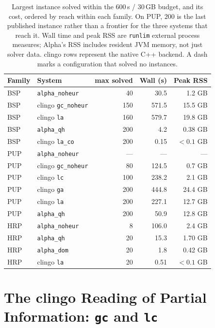 \begin{table}[H]
\centering
\small
\begin{tabular}{llrrr}
\toprule
\textbf{Family} & \textbf{System} & \textbf{max solved} & \textbf{Wall (s)} & \textbf{Peak RSS}\\
\midrule
BSP & \texttt{alpha\_noheur}            & 40  & 30.5  & 1.2 GB\\
BSP & clingo \texttt{gc\_noheur}        & 150 & 571.5 & 15.5 GB\\
BSP & clingo \texttt{la}               & 160 & 579.7 & 19.8 GB\\
BSP & \texttt{alpha\_qh}               & 200 & 4.2   & 0.38 GB\\
BSP & clingo \texttt{la\_co}            & 200 & 0.15  & $<0.1$ GB\\
\midrule
PUP & \texttt{alpha\_noheur}            & --- & ---   & ---\\
PUP & clingo \texttt{gc\_noheur}        & 80  & 124.5 & 0.7 GB\\
PUP & clingo \texttt{lc}               & 100 & 238.2 & 2.1 GB\\
PUP & clingo \texttt{ga}               & 200 & 444.8 & 24.4 GB\\
PUP & clingo \texttt{la}               & 200 & 227.1 & 12.7 GB\\
PUP & \texttt{alpha\_qh}               & 200 & 50.9  & 12.8 GB\\
\midrule
HRP & \texttt{alpha\_noheur}            & 8   & 106.0 & 2.4 GB\\
HRP & \texttt{alpha\_qh}               & 20  & 15.3  & 1.70 GB\\
HRP & \texttt{alpha\_dom}              & 20  & 1.8   & 0.42 GB\\
HRP & clingo \texttt{la}               & 20  & 0.51  & $<0.1$ GB\\
\bottomrule
\end{tabular}
\caption{Largest instance solved within the 600\,s / 30\,GB budget, and its cost, ordered by reach within each family. On PUP, $200$ is the last published instance rather than a frontier for the three systems that reach it. Wall time and peak RSS are \texttt{runlim} external process measures; Alpha's RSS includes resident JVM memory, not just solver data. clingo rows represent the native C++ backend. A dash marks a configuration that solved no instances.}
\label{tab:alpha-frontier}
\end{table}

\FloatBarrier
\section{The clingo Reading of Partial Information: \texttt{gc} and \texttt{lc}}
\label{sec:clingo-semantics}

